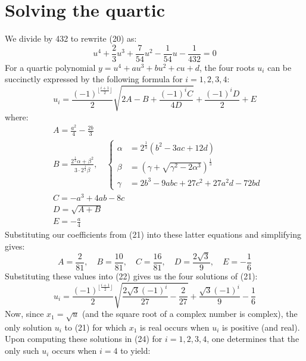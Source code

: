 \documentclass{article}
\begin{document}
\section{Solving the quartic}
We divide by 432 to rewrite (20) as:
\begin{equation}
    \tag{21}u^4+\frac{2}{3}u^3+\frac{7}{54}u^2-\frac{1}{54}u-\frac{1}{432}=0
\end{equation}
\noindent For a quartic polynomial $y=u^4 + au^3+bu^2+cu+d$, the four roots $u_i$ can be succinctly expressed by the following formula for $i=1,2,3,4$:
\newline
\begin{equation}
  \tag{22}  u_i=\frac{(-1)^{\big\lfloor \frac{i+1}{2} \big\rfloor}}{2}\sqrt{2A-B+\frac{(-1)^iC}{4D}}+\frac{(-1)^iD}{2}+E
\end{equation}
\noindent where: 
\begin{align*}
    &A = \frac{a^2}{4} - \frac{2b}{3} \\
    &B = \frac{2^{\frac{1}{3}}\alpha + \beta^2}{3 \cdot 2^{\frac{1}{3}} \beta}, \quad
    \left\{
    \begin{aligned}
        \alpha &= 2^{\frac{1}{3}}(b^2 - 3ac + 12d) \\
        \beta &= \left(\gamma + \sqrt{\gamma^2 - 2\alpha^3}\right)^{\frac{1}{3}} \\
        \gamma &= 2b^3 - 9abc + 27c^2 + 27a^2d - 72bd
    \end{aligned}
    \right. \\
    &C = -a^3 + 4ab - 8c \\
    &D = \sqrt{A + B} \\
    &E = -\frac{a}{4}
\end{align*}
\noindent Substituting our coefficients from (21) into these latter equations and simplifying gives: 
\begin{equation*}
\tag{23} A = \frac{2}{81}, \quad B = \frac{10}{81}, \quad C = \frac{16}{81}, \quad D = \frac{2\sqrt{3}}{9}, \quad E = -\frac{1}{6}
\end{equation*}
\noindent Substituting these values into (22) gives us the four solutions of (21):
\begin{equation}
  \tag{24}  u_i=\frac{(-1)^{\big\lfloor \frac{i+1}{2} \big\rfloor}}{2}\sqrt{\frac{2\sqrt{3}(-1)^i}{27}-\frac{2}{27}}+\frac{\sqrt{3}(-1)^i}{9}-\frac{1}{6}
\end{equation}
Now, since $x_1=\sqrt{u}$ (and the square root of a complex number is complex), the only solution $u_i$ to (21) for which $x_1$ is real occurs when $u_i$ is positive (and real). Upon computing these solutions in (24) for $i=1,2,3,4$, one determines that the only such $u_i$ occurs when $i=4$ to yield:
\end{document}
